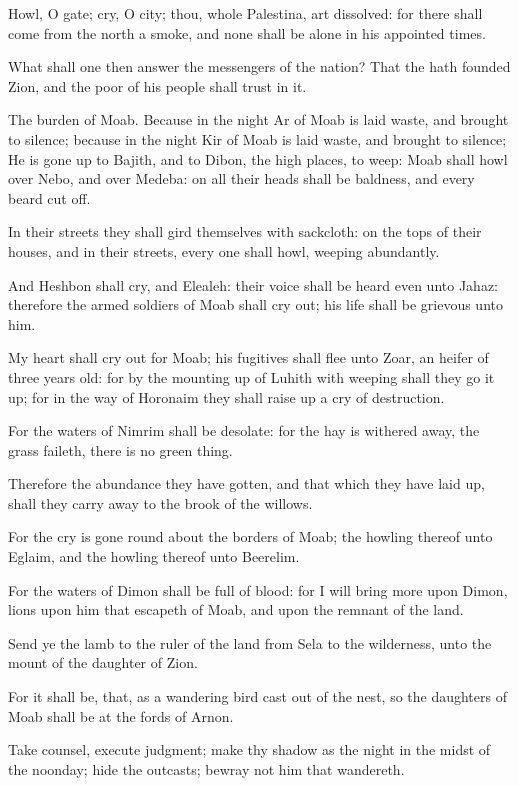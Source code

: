 \Verse Howl, O gate; cry, O city; thou, whole Palestina, art dissolved: for there shall come from the north a smoke, and none shall be alone in his appointed times.

\Verse What shall one then answer the messengers of the nation? That the \LORD hath founded Zion, and the poor of his people shall trust in it.


\Chapter
\Verse The burden of Moab. Because in the night Ar of Moab is laid waste, and brought to silence; because in the night Kir of Moab is laid waste, and brought to silence; \Verse He is gone up to Bajith, and to Dibon, the high places, to weep: Moab shall howl over Nebo, and over Medeba: on all their heads shall be baldness, and every beard cut off.

\Verse In their streets they shall gird themselves with sackcloth: on the tops of their houses, and in their streets, every one shall howl, weeping abundantly.

\Verse And Heshbon shall cry, and Elealeh: their voice shall be heard even unto Jahaz: therefore the armed soldiers of Moab shall cry out; his life shall be grievous unto him.

\Verse My heart shall cry out for Moab; his fugitives shall flee unto Zoar, an heifer of three years old: for by the mounting up of Luhith with weeping shall they go it up; for in the way of Horonaim they shall raise up a cry of destruction.

\Verse For the waters of Nimrim shall be desolate: for the hay is withered away, the grass faileth, there is no green thing.

\Verse Therefore the abundance they have gotten, and that which they have laid up, shall they carry away to the brook of the willows.

\Verse For the cry is gone round about the borders of Moab; the howling thereof unto Eglaim, and the howling thereof unto Beerelim.

\Verse For the waters of Dimon shall be full of blood: for I will bring more upon Dimon, lions upon him that escapeth of Moab, and upon the remnant of the land.


\Chapter
\Verse Send ye the lamb to the ruler of the land from Sela to the wilderness, unto the mount of the daughter of Zion.

\Verse For it shall be, that, as a wandering bird cast out of the nest, so the daughters of Moab shall be at the fords of Arnon.

\Verse Take counsel, execute judgment; make thy shadow as the night in the midst of the noonday; hide the outcasts; bewray not him that wandereth.

